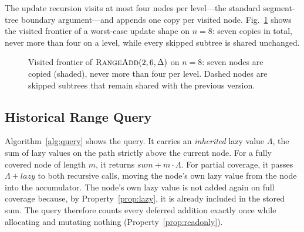 \documentclass[conference]{IEEEtran}
\begin{document}
The update recursion visits at most four nodes per level---the standard segment-tree boundary
argument---and appends one copy per visited node. Fig.~\ref{fig:frontier} shows the visited
frontier of a worst-case update shape on $n=8$: seven copies in total, never more than four on a
level, while every skipped subtree is shared unchanged.

\begin{figure}[!t]
\centering
{}
\caption{Visited frontier of $\textsc{RangeAdd}(2,6,\Delta)$ on $n=8$: seven nodes are copied
(shaded), never more than four per level. Dashed nodes are skipped subtrees that remain shared
with the previous version.}
\label{fig:frontier}
\end{figure}

\subsection{Historical Range Query}
\label{sec:query}

Algorithm~\ref{alg:query} shows the query. It carries an \emph{inherited} lazy value $\Lambda$,
the sum of lazy values on the path strictly above the current node. For a fully covered node of
length $m$, it returns $\textit{sum} + m \cdot \Lambda$. For partial coverage, it passes
$\Lambda + \textit{lazy}$ to both recursive calls, moving the node's own lazy value from the node
into the accumulator. The node's own lazy value is not added again on full coverage because, by
Property~\ref{prop:lazy}, it is already included in the stored sum. The query therefore counts
every deferred addition exactly once while allocating and mutating nothing
(Property~\ref{prop:readonly}).
\end{document}
